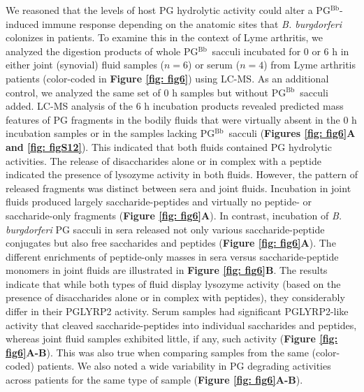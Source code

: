 \documentclass[twoside, watermark]{zHenriquesLab-StyleBioRxiv}
\newcommand{\pgbb}{PG$^\text{Bb}$}
\begin{document}
\vspace{1mm}
We reasoned that the levels of host PG hydrolytic activity could alter a \pgbb-induced immune response depending on the anatomic sites that \textit{B. burgdorferi} colonizes in patients. To examine this in the context of Lyme arthritis, we analyzed the digestion products of whole \pgbb~sacculi incubated for 0 or 6 h in either joint (synovial) fluid samples ($n = 6$) or serum ($n = 4$) from Lyme arthritis patients (color-coded in \textbf{Figure \ref{fig: fig6}}) using LC-MS. As an additional control, we analyzed the same set of 0 h samples but without \pgbb~sacculi added. LC-MS analysis of the 6 h incubation products revealed predicted mass features of PG fragments in the bodily fluids that were virtually absent in the 0 h incubation samples or in the samples lacking \pgbb~sacculi (\textbf{Figures \ref{fig: fig6}A and \ref{fig: figS12}}). This indicated that both fluids contained PG hydrolytic activities. The release of disaccharides alone or in complex with a peptide indicated the presence of lysozyme activity in both fluids. However, the pattern of released fragments was distinct between sera and joint fluids. Incubation in joint fluids produced largely saccharide-peptides and virtually no peptide- or saccharide-only fragments (\textbf{Figure \ref{fig: fig6}A}). In contrast, incubation of \textit{B. burgdorferi} PG sacculi in sera released not only various saccharide-peptide conjugates but also free saccharides and peptides (\textbf{Figure \ref{fig: fig6}A}). The different enrichments of peptide-only masses in sera versus saccharide-peptide monomers in joint fluids are illustrated in \textbf{Figure \ref{fig: fig6}B}. The results indicate that while both types of fluid display lysozyme activity (based on the presence of disaccharides alone or in complex with peptides), they considerably differ in their PGLYRP2 activity. Serum samples had significant PGLYRP2-like activity that cleaved saccharide-peptides into individual saccharides and peptides, whereas joint fluid samples exhibited little, if any, such activity (\textbf{Figure \ref{fig: fig6}A-B}). This was also true when comparing samples from the same (color-coded) patients. We also noted a wide variability in PG degrading activities across patients for the same type of sample (\textbf{Figure \ref{fig: fig6}A-B}).
\end{document}
